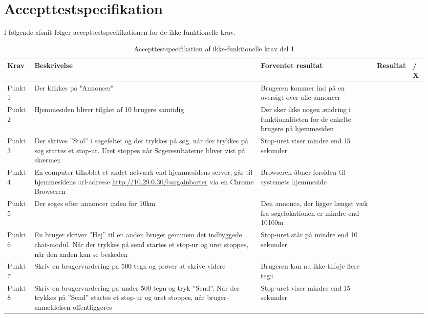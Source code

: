 \chapter{Accepttestspecifikation}\label{ch:Accepttestspecifikation}
I følgende afsnit følger accepttestspecifikationen for de ikke-funktionelle krav.

\setlength{\arrayrulewidth}{0.3mm}
\setlength{\tabcolsep}{2pt}
\renewcommand{\arraystretch}{1.5}
\begin{table}[H]
	\begin{tabular}{ |p{1.4cm}|p{5.0cm}|p{5.0cm}|p{3.8cm}|p{1.0cm}| } 
		\hline
		\textbf{Krav} & \textbf{Beskrivelse} & \textbf{Forventet resultat} & \textbf{Resultat} & \textbf{\checkmark / X} \\
		\hline
		Punkt 1 & Der klikkes på "Annoncer"  & Brugeren kommer ind på en oversigt over alle annoncer &  & \\
		\hline
		Punkt 2 & Hjemmesiden bliver tilgået af 10 brugere samtidig & Der sker ikke nogen ændring i funktionaliteten for de enkelte brugere på hjemmesiden &  &  \\
		\hline
		Punkt 3 & Der skrives ''Stol'' i søgefeltet og der trykkes på søg, når der trykkes på søg startes et stop-ur. Uret stoppes når Søgeresultaterne bliver vist på skærmen & Stop-uret viser mindre end 15 sekunder &  &  \\
		\hline
		Punkt 4 & En computer tilkoblet et andet netværk end hjemmesidens server, går til hjemmesidens url-adresse \url{http://10.29.0.30/bargainbarter} via en Chrome Browseren & Browseren åbner forsiden til systemets hjemmeside  &  & \\
		\hline
		Punkt 5 & Der søges efter annoncer inden for 10km & Den annonce, der ligger længst væk fra søgelokationen er mindre end 10100m &  &  \\
		\hline 
		Punkt 6 & En bruger skriver ''Hej'' til en anden bruger gennnem det indbyggede chat-modul. Når der trykkes på send startes et stop-ur og uret stoppes, når den anden kan se beskeden & Stop-uret står på mindre end 10 sekunder & &  \\
		\hline
		Punkt 7 & Skriv en brugervurdering på 500 tegn og prøver at skrive videre & Brugeren kan nu ikke tilføje flere tegn &  & \\
		\hline
		Punkt 8 & Skriv en brugervurdering på under 500 tegn og tryk ''Send''. Når der trykkes på ''Send'' startes et stop-ur og uret stoppes, når bruger-anmeldelsen offentliggøres & Stop-uret viser mindre end 15 sekunder &  & \\
		\hline
	\end{tabular}
	\caption{Accepttestspecifikation af ikke-funktionelle krav del 1}
	\label{table:accepttest_ifk1}
\end{table}


